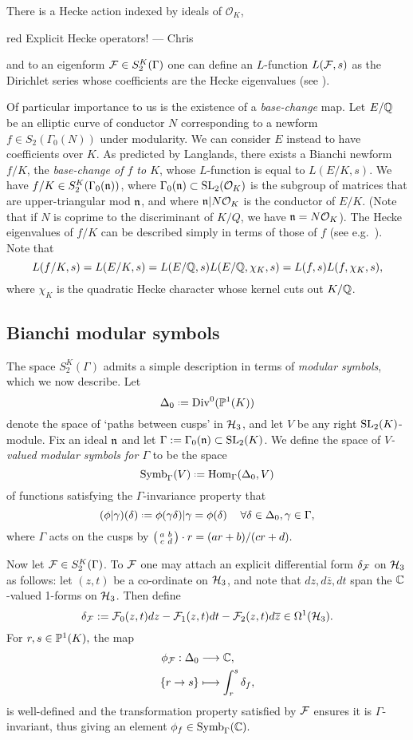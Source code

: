 \documentclass[a4paper,10pt]{article}
\newcommand{\CWnote}[1]{
 \begin{color}{red}
 \marginpar{$\spadesuit$} #1
  --- Chris
 \end{color}
}
\newcommand{\CWnote}[1]{

}
\numberwithin{equation}{section}
\begin{document}
 There is a Hecke action indexed by ideals of $\mathcal{O}_K$, \CWnote{Explicit Hecke operators!} and to an eigenform $\mathcal{F} \in S_2^K(\Gamma)$ one can define an $L$-function $L(\mathcal{F},s)$ as the Dirichlet series whose coefficients are the Hecke eigenvalues (see \cite[\S1.2]{Wil17}). 

Of particular importance to us is the existence of a \emph{base-change} map. Let $E/\mathbb{Q}$ be an elliptic curve of conductor $N$ corresponding to a newform $f \in S_2(\Gamma_0(N))$ under modularity. We can consider $E$ instead to have coefficients over $K$. As predicted by Langlands, there exists a Bianchi newform $f/K$, the \emph{base-change of $f$ to $K$}, whose $L$-function is equal to $L(E/K,s)$. We have $f/K \in S_2^K(\Gamma_0(\mathfrak{n}))$, where $\Gamma_0(\mathfrak{n}) \subset \mathrm{SL}_2(\mathcal{O}_K)$ is the subgroup of matrices that are upper-triangular mod $\mathfrak{n}$, and where $\mathfrak{n}|N\mathcal{O}_K$ is the conductor of $E/K$. (Note that if $N$ is coprime to the discriminant of $K/Q$, we have $\mathfrak{n} = N\mathcal{O}_K$). The Hecke eigenvalues of $f/K$ can be described simply in terms of those of $f$ (see e.g.\ \cite[\S7.2]{BW18}). Note that
\[
    L(f/K,s) = L(E/K,s) = L(E/\mathbb{Q},s)L(E/\mathbb{Q},\chi_K,s) =  L(f,s)L(f,\chi_K,s),
\]
where $\chi_K$ is the quadratic Hecke character whose kernel cuts out $K/\mathbb{Q}$.

\subsection{Bianchi modular symbols}
The space $S_2^K(\Gamma)$ admits a simple description in terms of \emph{modular symbols}, which we now describe. Let 
\[
    \Delta_0 \defeq \mathrm{Div}^0(\Proj(K))
\]
denote the space of `paths between cusps' in $\mathcal{H}_3$, and let $V$ be any right $\mathrm{SL}_2(K)$-module. Fix an ideal $\mathfrak{n}$ and let $\Gamma := \Gamma_0(\mathfrak{n}) \subset\mathrm{SL}_2(K)$. We define the space of \emph{$V$-valued modular symbols for $\Gamma$} to be the space
\[
    \symb_{\Gamma}(V) \defeq \mathrm{Hom}_\Gamma(\Delta_0,V)
\]
of functions satisfying the $\Gamma$-invariance property that
\[(\phi|\gamma)(\delta)\defeq \phi(\gamma \delta)|\gamma = \phi(\delta)\hspace{12pt} \forall \delta\in\Delta_0, \gamma\in\Gamma,\]
where $\Gamma$ acts on the cusps by $\left(\begin{smallmatrix}a & b\\c & d\end{smallmatrix}\right)\cdot r = (ar+b)/(cr+d).$ 

Now let $\mathcal{F} \in S_2^K(\Gamma)$. To $\mathcal{F}$ one may attach an explicit differential form $\delta_{\mathcal{F}}$ on $\mathcal{H}_3$ as follows: let $(z,t)$ be a co-ordinate on $\mathcal{H}_3$, and note that $dz, d\overline{z}, dt$ span the $\mathbb{C}$-valued 1-forms on $\mathcal{H}_3$. Then define
\[
    \delta_{\mathcal{F}} := \mathcal{F}_0(z,t)dz - \mathcal{F}_1(z,t)dt - \mathcal{F}_2(z,t)d\overline{z} \in \Omega^1(\mathcal{H}_3).
\]
For $r,s \in \mathbb{P}^1(K),$ the map
\begin{align*}
    \phi_{\mathcal{F}} : \Delta_0 &\longrightarrow \mathbb{C},\\
    \{r\to s\} &\longmapsto \int_{r}^s \delta_f,
\end{align*}
is well-defined and the transformation property satisfied by $\mathcal{F}$ ensures it is $\Gamma$-invariant, thus giving an element $\phi_f \in \mathrm{Symb}_\Gamma(\mathbb{C}).$ 
\end{document}
